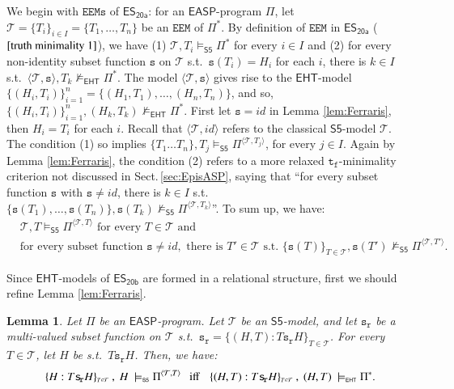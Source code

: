\documentclass[submission,copyright,creativecommons]{eptcs}
\newcommand{\tuple}[1]  { \langle #1 \rangle }
\newcommand{\doublequotes}[1]  {``#1''}
\newcommand{\set}[1]  { \{ #1 \} }
\newcommand{\logic}[1]  { \ensuremath{\mathsf{#1}} }
\newcommand{\sfive}  { \logic{S5} }
\newcommand{\EHT}  { \logic{EHT} }
\newcommand{\EASP}  { \logic{EASP} }
\newcommand{\epispec}  { \Pi }
\newcommand{\ESyirmia}  { \logic{ES_{\scriptscriptstyle{20a}} } }
\newcommand{\ESyirmib}  { \logic{ES_{\scriptscriptstyle{20b}} } }
\newcommand{\weak}  { \texttt{s} }
\newcommand{\functional}  { \texttt{f} }
\newcommand{\relational}  { \texttt{r} }
\newcommand{\weakrelational}  { \weak_{\!\relational} }
\newcommand{\tfunctional}  { \texttt{t}_{\!\functional} }
\newcommand{\EEM} { \texttt{EEM} }
\newcommand{\EEMs}  { \texttt{EEMs} }
\newcommand{\Ehtmodels}  { \models_{\scriptscriptstyle \EHT} }
\newcommand{\notEhtmodels}  { \not\models_{\scriptscriptstyle \EHT} }
\newcommand{\sfivemodels}  { \models_{\scriptscriptstyle{\sfive}} }
\newcommand{\notsfivemodels}  { \not\models_{\scriptscriptstyle{\sfive}} }
\newtheorem{lem}{Lemma}
\begin{document}
We begin with $\EEMs$ of $\ESyirmia$:
for an $\EASP$-program $\epispec$, let 
$\mathcal T=\set{T_i}_{i \in I}=\set{T_1, \ldots, T_n}$ be an 
$\EEM$ of $\epispec^*$. By definition of $\EEM$ in $\ESyirmia$ 
($\ref{truth minimality 1}$), we have
(1) $\mathcal T,T_i \sfivemodels \epispec^*$ for every $i \in I$ and
(2) for every non-identity subset function $\weak$ on $\mathcal T$
s.t.\ $\weak(T_i)=H_i$ for each $i$, there is $k\in I$ s.t.\ $\tuple{\mathcal T,\weak}, T_k \notEhtmodels \epispec^*$. The model $\tuple{\mathcal T,\weak}$ gives rise to the $\EHT$-model 
$\set{(H_i,T_i)}^{n}_{\!i=1}=\set{(H_1,T_1),\ldots, (H_n,T_n)}$, and so, 
$\set{(H_i,T_i)}^{n}_{\!i=1}, (H_k,T_k) \notEhtmodels \epispec^*$.
First let $\weak = id$ in Lemma \ref{lem:Ferraris}, then $H_i=T_i$  for each $i$.
Recall that $\tuple{\mathcal T, id}$ refers to the classical $\sfive$-model $\mathcal T$. The condition (1) so implies 
$\set{T_1 \ldots T_n}, T_j \sfivemodels \epispec^{\tuple{\mathcal T,T_j}}$,
for every $j\in I$. 
Again by Lemma \ref{lem:Ferraris}, the condition (2) refers to a more relaxed 
$\tfunctional$-minimality criterion 
not discussed in Sect.\,\ref{sec:EpisASP}, saying that
\doublequotes{for every subset function $\weak$ with $\weak \neq id$, 
there is $k \in I$ s.t.\
$\set{\weak(T_1), \ldots, \weak(T_n)}, \weak(T_k) \not\sfivemodels \epispec^{\tuple{\mathcal T, T_k}}$}.
To sum up, we have:
%
\begin{align}\label{correspondence:EEMs in EASP}
&\mathcal T, T \sfivemodels \epispec^{\tuple{\mathcal T,T}} \text{ for every } T \in \mathcal T 
\text{\ \ \ and  \ \ \ \ } 
\\
&\text{for every subset function } \weak \neq id, \text{ there is } T' \in \mathcal T 
\text{ s.t.\ }
\set{\weak(T)}_{T\in \mathcal T}, \weak(T') \notsfivemodels \epispec^{\tuple{\mathcal T, T'}}. 
\nonumber
\end{align}

Since $\EHT$-models of $\ESyirmib$ are formed in a relational structure, 
first we should refine Lemma \ref{lem:Ferraris}.
%
\begin{lem}\label{lem:Ferraris2}
Let $\epispec$ be an $\EASP$-program. Let $\mathcal T$ be an $\sfive$-model, and
let $\weakrelational$ be a multi-valued
subset function on $\mathcal T$ s.t.\ $\weakrelational =
\set{(H,T) : T \weakrelational H}_{\scriptscriptstyle{T \in \mathcal T}}$. 
For every $T \in \mathcal T$, let $H$ be s.t.\ 
$T\weakrelational H$. Then, we have: 
%
\begin{align*}
\set{H : T\weakrelational H}_{\scriptscriptstyle{T \in \mathcal T}}~,~H~\sfivemodels \epispec^{\tuple{\mathcal T, T}} \text{ \  \ iff \,  \ }
\set{(H,T) : T \weakrelational H}_{\scriptscriptstyle{T\in \mathcal T}}~,~(H,T)~\Ehtmodels \epispec^*.
\end{align*}
\end{lem}
\end{document}

